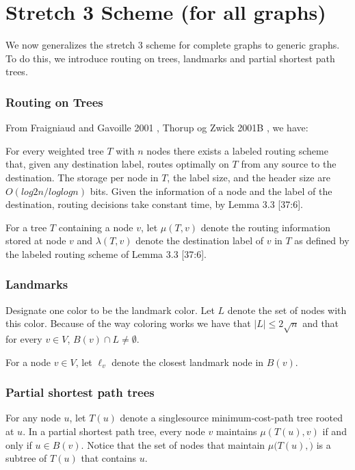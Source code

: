 \chapter{Stretch 3 Scheme (for all graphs)}
We now generalizes the stretch 3 scheme for complete graphs to generic graphs. To do this, we introduce routing on trees, landmarks and partial shortest path trees.

\subsection{Routing on Trees}
From Fraigniaud and Gavoille 2001 \cite{fraigniaudGavoille2001}, Thorup og Zwick 2001B \cite{thorupZwick2001b}, we have:

For every weighted tree $T$ with $n$ nodes there exists a labeled routing scheme that, given any destination label, routes optimally on $T$ from any source to the destination. The storage per node in $T$, the label size, and the header size are $O(log2 n/ log log n)$ bits. Given the information of a node and the label of the destination, routing decisions take constant time, by Lemma 3.3 \cite{compactNameIndepRouting}[37:6].

For a tree $T$ containing a node $v$, let $\mu(T, v)$ denote the routing information
stored at node $v$ and $\lambda(T, v)$ denote the destination label of $v$ in $T$ as defined by the
labeled routing scheme of Lemma 3.3 \cite{compactNameIndepRouting}[37:6].

\subsection{Landmarks}
Designate one color to be the landmark color. Let $L$ denote the set of nodes with this color. Because of the way coloring works we have that $|L| \leq 2 \sqrt{n}$ and that for every $v\in V$, $B(v)\cap L \neq \emptyset$.

For a node $v\in V$, let $\ell_v$ denote the closest landmark node in $B(v)$.

\subsection{Partial shortest path trees}
For any node $u$, let $T(u)$ denote a singlesource minimum-cost-path tree rooted at $u$. In a partial shortest path tree, every node $v$ maintains $\mu(T(u),v)$ if and only if $u \in B(v)$. Notice that the set of nodes that maintain $\mu(T(u),\dot)$ is a subtree of $T(u)$ that contains $u$.\\

